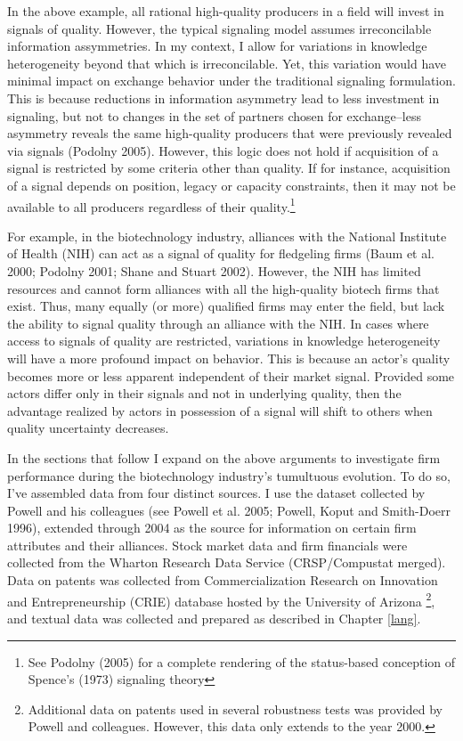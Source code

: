 In the above example, all rational high-quality producers in a field will invest in signals of quality. However, the typical signaling model assumes irreconcilable information assymmetries. In my context, I allow for variations in knowledge heterogeneity beyond that which is irreconcilable. Yet, this variation would have minimal impact on exchange behavior under the traditional signaling formulation. This is because reductions in information asymmetry lead to less investment in signaling, but not to changes in the set of partners chosen for exchange--less asymmetry reveals the same high-quality producers that were previously revealed via signals (Podolny 2005). However, this logic does not hold if acquisition of a signal is restricted by some criteria other than quality. If for instance, acquisition of a signal depends on position, legacy or capacity constraints, then it may not be available to all producers regardless of their quality.\footnote{See Podolny (2005) for a complete rendering of the status-based conception of Spence's (1973) signaling theory}

For example, in the biotechnology industry, alliances with the National Institute of Health (NIH) can act as a signal of quality for fledgeling firms (Baum et al. 2000; Podolny 2001; Shane and Stuart 2002). However, the NIH has limited resources and cannot form alliances with all the high-quality biotech firms that exist. Thus, many equally (or more) qualified firms may enter the field, but lack the ability to signal quality through an alliance with the NIH. In cases where access to signals of quality are restricted, variations in knowledge heterogeneity will have a more profound impact on behavior. This is because an actor's quality becomes more or less apparent independent of their market signal. Provided some actors differ only in their signals and not in underlying quality, then the advantage realized by actors in possession of a signal will shift to others when quality uncertainty decreases.

In the sections that follow I expand on the above arguments to investigate firm performance during the biotechnology industry's tumultuous evolution. To do so, I've assembled data from four distinct sources. I use the dataset collected by Powell and his colleagues (see Powell et al. 2005; Powell, Koput and Smith-Doerr 1996), extended through 2004 as the source for information on certain firm attributes and their alliances. Stock market data and firm financials were collected from the Wharton Research Data Service (CRSP/Compustat merged). Data on patents was collected from Commercialization Research on Innovation and Entrepreneurship (CRIE) database hosted by the University of Arizona \footnote{Additional data on patents used in several robustness tests was provided by Powell and colleagues. However, this data only extends to the year 2000.}, and textual data was collected and prepared as described in Chapter \ref{lang}. 

